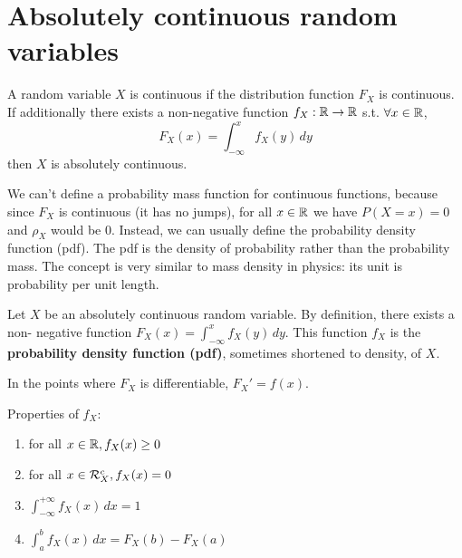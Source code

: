 \section{Absolutely continuous random variables}
\begin{definition}
    A random variable $X$ is continuous if the distribution function $F_X$ is continuous. If additionally there exists a non-negative function $f_X:\mathbb{R}\to\mathbb{R}$ s.t. $\forall x\in\mathbb{R}$,
    \begin{equation*}
        F_X(x)=\int_{-\infty}^{x} f_X(y) \,dy
    \end{equation*}
    then $X$ is absolutely continuous.
\end{definition}
We can't define a probability mass function for continuous functions, because since $F_X$ is continuous (it has no jumps), for all $x \in \mathbb{R}$ we have $P(X=x)=0$ and $\rho_X$ would be 0. Instead, we can usually define the probability density function (pdf). The pdf is the density of probability rather than the probability mass. The concept is very similar to mass density in physics: its unit is probability per unit length.
\begin{definition}
    Let $X$ be an absolutely continuous random variable. By definition, there exists a non- negative function $F_X(x)=\int_{-\infty}^{x} f_X(y) \,dy$. This function $f_X$ is the \textbf{probability density function (pdf)}, sometimes shortened to density, of $X$.
\end{definition}
\begin{remark}
    In the points where $F_X$ is differentiable, $F_X'=f(x)$.
\end{remark}
Properties of $f_X$:
\begin{enumerate}
    \item for all $x \in \mathbb{R}, f_X(x) \ge 0$
    \item for all $x \in \mathcal{R}_X^c, f_X(x)=0$
    \item $\int_{-\infty}^{+\infty}  f_X(x)\,dx =1$
    \item $\int_{a}^{b}  f_X(x)\,dx =F_X(b)-F_X(a)$
\end{enumerate}